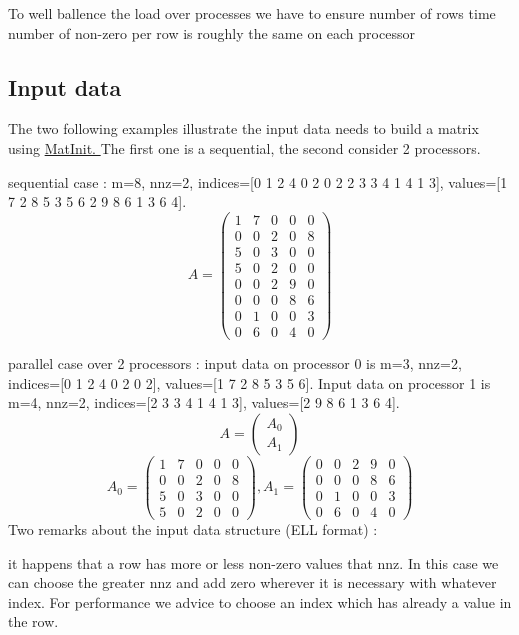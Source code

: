 To well ballence the load over processes we have to ensure number of rows time number of non-\/zero per row is roughly the same on each processor\hypertarget{data_struct_parall_input_example}{}\subsection{Input data}\label{data_struct_parall_input_example}
The two following examples illustrate the input data needs to build a matrix using \hyperlink{group__matmap__group11_ga16fec1005b6f01bda1dd6154c26c27ed}{Mat\-Init. } The first one is a sequential, the second consider 2 processors.
\begin{DoxyItemize}
\item sequential case \-: m=8, nnz=2, indices=\mbox{[}0 1 2 4 0 2 0 2 2 3 3 4 1 4 1 3\mbox{]}, values=\mbox{[}1 7 2 8 5 3 5 6 2 9 8 6 1 3 6 4\mbox{]}. \[ A = \left( \begin{array}{ccccc}1&7&0&0&0\\0&0&2&0&8\\5&0&3&0&0\\5&0&2&0&0\\0&0&2&9&0\\0&0&0&8&6\\0&1&0&0&3\\0&6&0&4&0\end{array} \right) \]
\item parallel case over 2 processors \-: input data on processor 0 is m=3, nnz=2, indices=\mbox{[}0 1 2 4 0 2 0 2\mbox{]}, values=\mbox{[}1 7 2 8 5 3 5 6\mbox{]}. Input data on processor 1 is m=4, nnz=2, indices=\mbox{[}2 3 3 4 1 4 1 3\mbox{]}, values=\mbox{[}2 9 8 6 1 3 6 4\mbox{]}. \[ A = \left( \begin{array}{c} A_0 \\ A_1 \end{array} \right) \] \[ A_0 = \left( \begin{array}{ccccc} 1&7&0&0&0\\0&0&2&0&8\\5&0&3&0&0\\5&0&2&0&0\end{array} \right) , A_1 = \left( \begin{array}{ccccc} 0&0&2&9&0\\0&0&0&8&6\\0&1&0&0&3\\0&6&0&4&0\end{array} \right) \] Two remarks about the input data structure (E\-L\-L format) \-:
\item it happens that a row has more or less non-\/zero values that nnz. In this case we can choose the greater nnz and add zero wherever it is necessary with whatever index. For performance we advice to choose an index which has already a value in the row.

\end{DoxyItemize}
